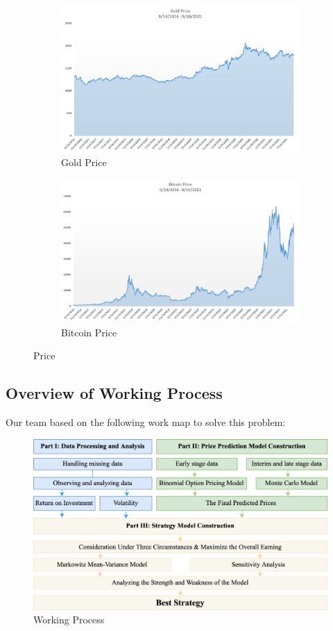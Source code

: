 \documentclass[12pt]{article}
\begin{document}
\begin{figure}[htp]
    \begin{subfigure}{.5\textwidth}
        \centering
        \includegraphics[width=.9\linewidth]{figures/fig1.png}  
        \caption{Gold Price}
        \label{fig1:1}
      \end{subfigure}
      \begin{subfigure}{.5\textwidth}
        \centering
        \includegraphics[width=.9\linewidth]{figures/fig2.png}  
        \caption{Bitcoin Price}
        \label{fig1:2}
      \end{subfigure}
      \caption{Price}
      \label{fig:fig1}
\end{figure}
\newpage
\subsection{Overview of Working Process}
Our team based on the following work map to solve this problem:
\begin{figure}[htp]
    \centering
        \includegraphics[width=.8\linewidth]{figures/process.png}  
        \caption{Working Process}
        \label{fig:fig2}
\end{figure}
\end{document}

